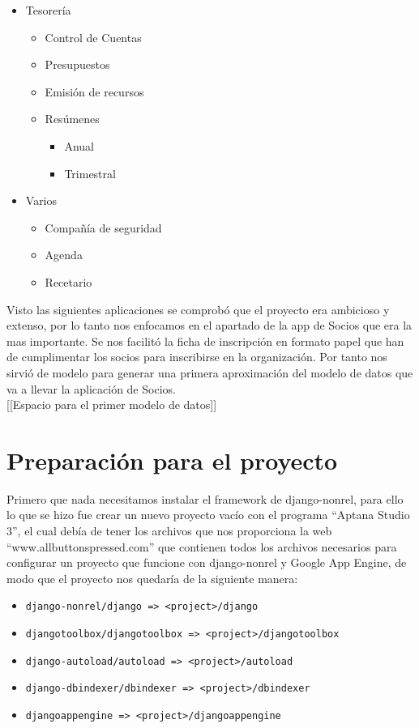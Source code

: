 \begin{itemize}
\item Tesorería
	\begin{itemize}
	\item Control de Cuentas
	\item Presupuestos
	\item Emisión de recursos
	\item Resúmenes
		\begin{itemize}
		\item Anual
		\item Trimestral
		\end{itemize}
	\end{itemize}

\item Varios
	\begin{itemize}
	\item Compañía de seguridad
	\item Agenda
	\item Recetario
	\end{itemize}
\end{itemize}

Visto las siguientes aplicaciones se comprobó que el proyecto era ambicioso y extenso, 
por lo tanto nos enfocamos en el apartado de la app de Socios que era la mas importante. 
Se nos facilitó la ficha de inscripción en formato papel que han de cumplimentar los socios para inscribirse en la organización.
Por tanto nos sirvió de modelo para generar una primera aproximación del modelo de datos que va a llevar la aplicación de Socios.\\

[[Espacio para el primer modelo de datos]]

\section{Preparación para el proyecto}
\label{4:sec3}

Primero que nada necesitamos instalar el framework de django-nonrel, para ello lo que se hizo fue crear un nuevo proyecto vacío con el 
programa ``Aptana Studio 3'', el cual debía de tener los archivos que nos proporciona la web ``www.allbuttonspressed.com'' que contienen 
todos los archivos necesarios para configurar un proyecto que funcione con django-nonrel y Google App Engine, 
de modo que el proyecto nos quedaría de la siguiente manera:

\begin{itemize}
  \item \lstinline!django-nonrel/django => <project>/django!
  \item \lstinline!djangotoolbox/djangotoolbox => <project>/djangotoolbox!
  \item \lstinline!django-autoload/autoload => <project>/autoload!
  \item \lstinline!django-dbindexer/dbindexer => <project>/dbindexer!
  \item \lstinline!djangoappengine => <project>/djangoappengine!
\end{itemize}

